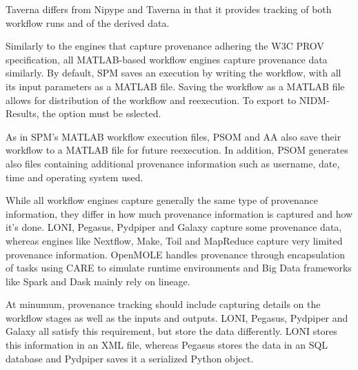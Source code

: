 \documentclass{report}
\newcommand{\tristan}[1]{\textcolor{red}{TG: #1}}
\begin{document}
            Taverna differs from Nipype and Taverna in that it provides 
            tracking of both workflow runs and of the derived data.

            Similarly to the engines that capture provenance adhering the
            W3C PROV specification, all MATLAB-based workflow engines capture
            provenance data similarly.
            By default, SPM saves an execution by writing the  workflow, with
            all its input parameters as a MATLAB file. Saving the workflow as
            a MATLAB file allows for distribution of the workflow and 
            reexecution. To export to NIDM-Results, the option must be 
            sslected.
            
            As in SPM's MATLAB workflow execution files, PSOM and AA 
            also save
            their workflow to a MATLAB file for future reexecution. 
            In addition, PSOM generates
            also files containing additional provenance information such 
            as username, date, time and operating system used.
            
            While all workflow engines capture generally the same type of 
            provenance information, they differ in how much provenance 
            information is captured and how it's done. LONI, Pegasus, Pydpiper 
            and Galaxy
            capture some provenance data, whereas engines 
            like Nextflow, Make, Toil and MapReduce capture very limited  
            provenance 
            information. OpenMOLE handles provenance through encapsulation of
            tasks using CARE to simulate runtime environments
            and Big Data frameworks like Spark and Dask mainly rely on 
            lineage.

            At minumum, provenance tracking should include 
            capturing details on the workflow stages as well as the inputs and
            outputs. LONI, Pegasus, Pydpiper and Galaxy all satisfy this 
            requirement, but store the data differently. LONI stores this 
            information in an XML file, whereas Pegasus stores the data in an 
            SQL database and Pydpiper saves it a serialized Python object.
\end{document}
